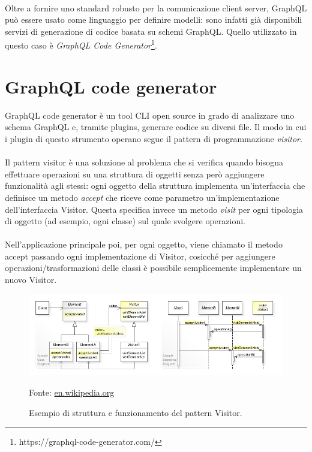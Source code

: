 \documentclass[a4paper, 12pt]{report}
\newcommand{\source}[1]{\caption*{Fonte: {#1}}}
\begin{document}
        \paragraph*{}
          Oltre a fornire uno standard robusto per la comunicazione client server, GraphQL può essere usato come linguaggio per definire modelli: sono infatti già disponibili servizi di generazione di codice basata su schemi GraphQL.
          Quello utilizzato in questo caso è \emph{GraphQL Code Generator}\footnote{https://graphql-code-generator.com/}.
      \newpage
    \section{GraphQL code generator}
      GraphQL code generator è un tool CLI open source in grado di analizzare uno schema GraphQL e, tramite plugins, generare codice su diversi file.
      Il modo in cui i plugin di questo strumento operano segue il pattern di programmazione \emph{visitor}.
      \paragraph*{}
        Il pattern visitor è una soluzione al problema che si verifica quando bisogna effettuare operazioni su una struttura di oggetti senza però aggiungere funzionalità agli stessi:
        ogni oggetto della struttura implementa un'interfaccia che definisce un metodo \emph{accept} che riceve come parametro un'implementazione dell'interfaccia Visitor.
        Questa specifica invece un metodo \emph{visit} per ogni tipologia di oggetto (ad esempio, ogni classe) sul quale svolgere operazioni.
      \paragraph*{}
        Nell'applicazione principale poi, per ogni oggetto, viene chiamato il metodo accept passando ogni implementazione di Visitor, cosicché per aggiungere operazioni/trasformazioni delle classi è possibile semplicemente implementare un nuovo Visitor.
      \begin{figure}[H]
          \includegraphics[width=\textwidth]{visitor-example.jpg}
          \caption{Esempio di struttura e funzionamento del pattern Visitor.}
          \source{\href{https://en.wikipedia.org/wiki/Visitor_pattern}{en.wikipedia.org}}
      \end{figure}
\end{document}
